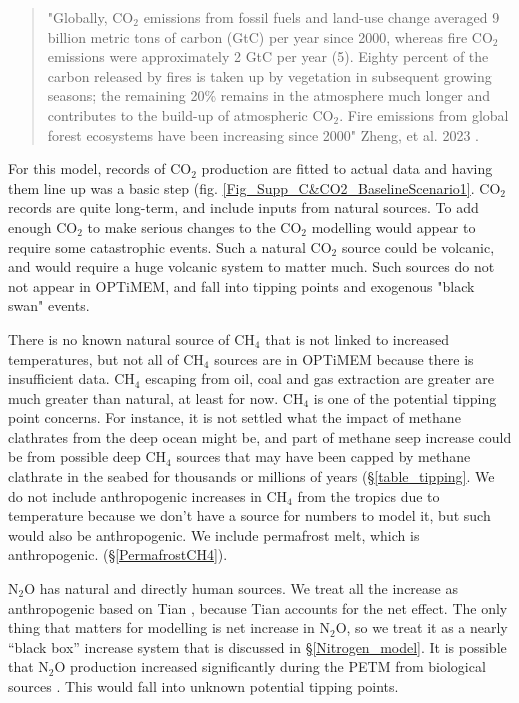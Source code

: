 \documentclass{article}
\begin{document}
\begin{quote}
"Globally, CO$_2$ emissions from fossil fuels and land-use change averaged 9 billion metric tons of carbon (GtC) per year since 2000, whereas fire CO$_2$ emissions were approximately 2 GtC per year (5). Eighty percent of the carbon released by fires is taken up by vegetation in subsequent growing seasons; the remaining 20\% remains in the atmosphere much longer and contributes to the build-up of atmospheric CO$_2$. Fire emissions from global forest ecosystems have been increasing since 2000" Zheng, et al. 2023 \cite{Zheng2023RecorodBorealCO2}.
\end{quote}

For this model, records of CO$_2$ production are fitted to actual data and having them line up was a basic step (fig. \ref{Fig_Supp_C&CO2_BaselineScenario1}. CO$_2$ records are quite long-term, and include inputs from natural sources. To add enough CO$_2$ to make serious changes to the CO$_2$ modelling would appear to require some catastrophic events. Such a natural CO$_2$ source could be volcanic, and would require a huge volcanic system to matter much. Such sources do not not appear in OPTiMEM, and fall into tipping points and exogenous "black swan" events. 

There is no known natural source of CH$_4$ that is not linked to increased temperatures, but not all of CH$_4$ sources are in OPTiMEM because there is insufficient data. CH$_4$ escaping from oil, coal and gas extraction are greater are much greater than natural, at least for now. CH$_4$ is one of the potential tipping point concerns. For instance, it is not settled what the impact of methane clathrates from the deep ocean might be, and part of methane seep increase could be from possible deep CH$_4$ sources that may have been capped by methane clathrate in the seabed for thousands or millions of years (\S\ref{table_tipping}. We do not include anthropogenic increases in CH$_4$ from the tropics due to temperature because we don’t have a source for numbers to model it, but such would also be anthropogenic. We include permafrost melt, which is anthropogenic. (\S\ref{PermafrostCH4}). 

N$_2$O has natural and directly human sources. We treat all the increase as anthropogenic based on Tian \cite{Tian2020N2OSources_sinks}, because Tian accounts for the net effect. The only thing that matters for modelling is net increase in N$_2$O, so we treat it as a nearly “black box” increase system that is discussed in \S\ref{Nitrogen_model}.  It is possible that N$_2$O production increased significantly during the PETM from biological sources \cite{ROBERSON2011_N2OandCH4Proterozoic}. This would fall into unknown potential tipping points.
\end{document}
